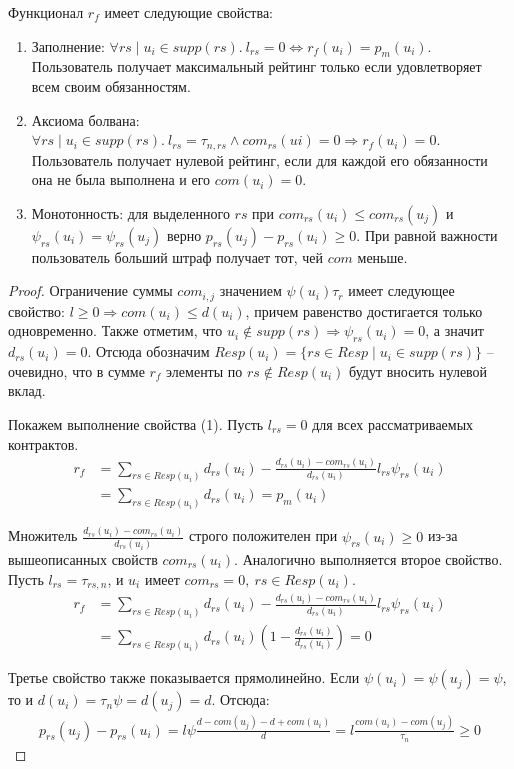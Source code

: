 \documentclass[specification,annotation]{itmo-student-thesis}
\begin{document}
\begin{lemma}
Функционал $r_f$ имеет следующие свойства:
\begin{enumerate}
\item Заполнение: $\forall rs \mid u_i \in supp(rs) . \ l_{rs} = 0
  \Leftrightarrow r_f(u_i) = p_m(u_i)$. Пользователь получает максимальный
  рейтинг только если удовлетворяет всем своим обязанностям.
\item Аксиома болвана: $\forall rs \mid u_i \in supp(rs) . \ l_{rs} = \tau_{n,rs}
   \wedge com_{rs}(ui) = 0 \Rightarrow r_f(u_i) = 0$. Пользователь
  получает нулевой рейтинг, если для каждой его обязанности она не
  была выполнена и его $com(u_i) = 0$.
\item Монотонность: для выделенного $rs$ при $com_{rs}(u_i) \leq
  com_{rs}(u_j)$ и $\psi_{rs}(u_i) = \psi_{rs}(u_j)$ верно
  $p_{rs}(u_j) - p_{rs}(u_i) \ge 0$. При равной важности пользователь
  больший штраф получает тот, чей $com$ меньше.
\end{enumerate}
\end{lemma}
\begin{proof}
Ограничение суммы $com_{i,j}$ значением $\psi(u_i) \tau_r$ имеет
следующее свойство: $l \ge 0 \Rightarrow com(u_i) \le d(u_i)$, причем
равенство достигается только одновременно. Также отметим, что $u_i
\notin supp(rs) \Rightarrow \psi_{rs}(u_i) = 0$, а значит $d_{rs}(u_i)
= 0$. Отсюда обозначим $Resp(u_i) = \{rs \in Resp \mid u_i \in
supp(rs) \}$ -- очевидно, что в сумме $r_f$ элементы по $rs \notin
Resp(u_i)$ будут вносить нулевой вклад.

Покажем выполнение свойства (1). Пусть $l_{rs} = 0$ для всех
рассматриваемых контрактов.
\begin{align*}
  r_f &= \sum_{rs \in Resp(u_i)}{d_{rs}(u_i)  -  \frac{d_{rs}(u_i) - com_{rs}(u_i)}{d_{rs}(u_i)} l_{rs} \psi_{rs}(u_i)} \\
      &= \sum_{rs \in Resp(u_i)}{d_{rs}(u_i)} = p_m(u_i)
\end{align*}

Множитель $\frac{d_{rs}(u_i) - com_{rs}(u_i)}{d_{rs}(u_i)}$ строго
положителен при $\psi_{rs}(u_i) \ge 0$ из-за вышеописанных свойств
$com_{rs}(u_i)$. Аналогично выполняется второе свойство. Пусть $l_{rs}
= \tau_{rs,n}$, и $u_i$ имеет $com_{rs} = 0 , \ rs \in Resp(u_i)$.
\begin{align*}
  r_f &= \sum_{rs \in Resp(u_i)}{d_{rs}(u_i)  -  \frac{d_{rs}(u_i) - com_{rs}(u_i)}{d_{rs}(u_i)} l_{rs} \psi_{rs}(u_i)} \\
      &= \sum_{rs \in Resp(u_i)}{d_{rs}(u_i)(1  -  \frac{d_{rs}(u_i)}{d_{rs}(u_i)})} = 0
\end{align*}

Третье свойство также показывается прямолинейно. Если $\psi(u_i) =
\psi(u_j) = \psi$, то и $d(u_i) = \tau_n \psi = d(u_j) = d$. Отсюда:
\begin{align*}
p_{rs}(u_j) - p_{rs}(u_i) = l \psi \frac{d - com(u_j) - d + com(u_i)}{d} = l \frac{com(u_i) - com(u_j)}{\tau_n} \ge 0
\end{align*}

\end{proof}
\end{document}
